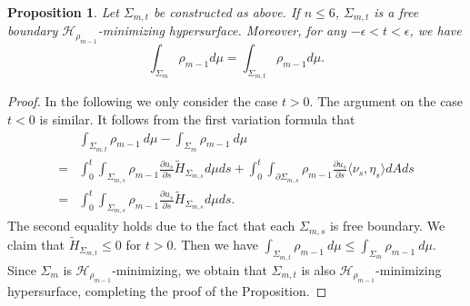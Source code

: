 \documentclass[11pt,letterpaper]{amsart}
\newtheorem{proposition}[theorem]{Proposition}
\theoremstyle{definition}
\theoremstyle{remark}
\numberwithin{equation}{section}
\begin{document}
\begin{proposition}\label{foliation2}
    Let $\Sigma_{m,t}$ be constructed as above. If $n\leq 6$, $\Sigma_{m,t}$ is a free boundary $\mathcal{H}_{\rho_{m-1}}$-minimizing hypersurface. Moreover, for any $ -\epsilon<t<\epsilon$, we have
    \begin{equation}\label{eqfolaition}
        \int_{\Sigma_{m}}\rho_{m-1}d\mu = \int_{\Sigma_{m,t}}\rho_{m-1}d\mu.
    \end{equation}
\end{proposition}
\begin{proof}
    In the following we only consider the case $t>0$. The argument on  the case $t<0$ is similar. 
    It follows from the first variation formula that
    \[
    \begin{aligned}
    &\int_{\Sigma_{m,t}}\rho_{m-1}\ d\mu -\int_{\Sigma_{m}}\rho_{m-1}\ d\mu\\=
    &\int_{0}^{t}\int_{\Sigma_{m,s}}\rho_{m-1}\frac{\partial u_{s}}{\partial s}\tilde{H}_{\Sigma_{m,s}}d\mu ds+\int_{0}^{t}\int_{\partial \Sigma_{m,s}}\rho_{m-1}\frac{\partial u_{s}}{\partial s}\langle \nu_{s},\eta_{s}\rangle dA ds\\=&\int_{0}^{t}\int_{\Sigma_{m,s}}\rho_{m-1}\frac{\partial u_{s}}{\partial s}\tilde{H}_{\Sigma_{m,s}}d\mu ds.
    \end{aligned}
    \]
   The second equality holds due to the fact that each $\Sigma_{m,s}$ is free boundary. We claim that $\tilde{H}_{\Sigma_{m,t}}\leq 0$ for $t>0$. Then we have $\int_{\Sigma_{m,t}}\rho_{m-1}\ d\mu \leq \int_{\Sigma_{m}}\rho_{m-1}\ d\mu$. Since $\Sigma_{m}$ is $\mathcal{H}_{\rho_{m-1}}$-minimizing, we obtain that $\Sigma_{m,t}$ is also $\mathcal{H}_{\rho_{m-1}}$-minimizing hypersurface, completing the proof of the Proposition.
   

\end{proof}
\end{document}
